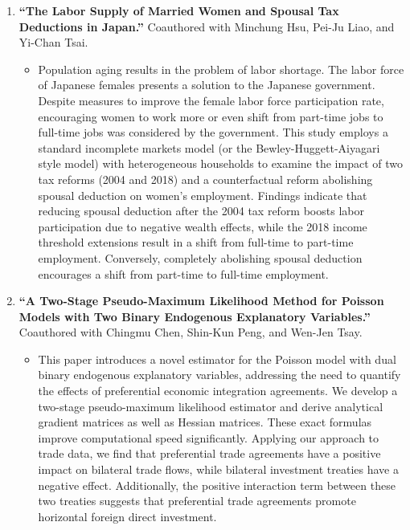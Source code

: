 \documentclass{article}
\begin{document}
\begin{enumerate}
\begin{itemize}
    \end{itemize}
    \item \textbf{“The Labor Supply of Married Women and Spousal Tax Deductions in Japan.”} Coauthored with Minchung Hsu, Pei-Ju Liao, and Yi-Chan Tsai.
    \begin{itemize}
        \item[] Population aging results in the problem of labor shortage. The labor force of Japanese females presents a solution to the Japanese government. Despite measures to improve the female labor force participation rate, encouraging women to work more or even shift from part-time jobs to full-time jobs was considered by the government. This study employs a standard incomplete markets model (or the Bewley-Huggett-Aiyagari style model) with heterogeneous households to examine the impact of two tax reforms (2004 and 2018) and a counterfactual reform abolishing spousal deduction on women's employment. Findings indicate that reducing spousal deduction after the 2004 tax reform boosts labor participation due to negative wealth effects, while the 2018 income threshold extensions result in a shift from full-time to part-time employment. Conversely, completely abolishing spousal deduction encourages a shift from part-time to full-time employment.
    \end{itemize}
    \item \textbf{“A Two-Stage Pseudo-Maximum Likelihood Method for Poisson Models with Two Binary Endogenous Explanatory Variables.”} Coauthored with Chingmu Chen, Shin-Kun Peng, and Wen-Jen Tsay.
    \begin{itemize}
        \item[] This paper introduces a novel estimator for the Poisson model with dual binary endogenous explanatory variables, addressing the need to quantify the effects of preferential economic integration agreements. We develop a two-stage pseudo-maximum likelihood estimator and derive analytical gradient matrices as well as Hessian matrices. These exact formulas improve computational speed significantly. Applying our approach to trade data, we find that preferential trade agreements have a positive impact on bilateral trade flows, while bilateral investment treaties have a negative effect. Additionally, the positive interaction term between these two treaties suggests that preferential trade agreements promote horizontal foreign direct investment.
    \end{itemize}

\end{enumerate}
\end{document}
